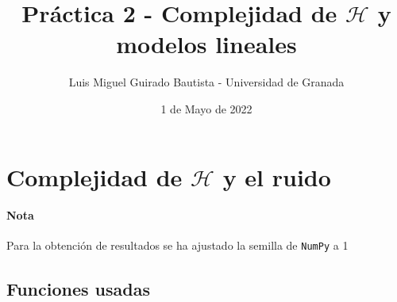 \documentclass{article}
\title{Práctica 2 - Complejidad de $\mathcal{H}$ y modelos lineales}
\author{Luis Miguel Guirado Bautista - Universidad de Granada}
\date{1 de Mayo de 2022}
\begin{document}
    \begin{titlepage}
        \maketitle
        \thispagestyle{empty}
    \end{titlepage}

    \pagebreak

    \tableofcontents

    \pagebreak
    \rfoot{\thepage}
    \section{Complejidad de $\mathcal{H}$ y el ruido}

    \paragraph*{Nota}Para la obtención de resultados se ha ajustado la semilla
    de \texttt{NumPy} a 1

    \subsection*{Funciones usadas}
\end{document}
